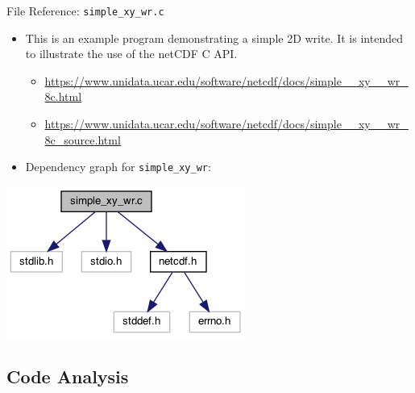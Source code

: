 \documentclass[compress,11pt,xcolor=svgnames,aspectratio=169]{beamer}
\begin{document}
\begin{frame}[fragile]{File Reference: \texttt{simple\_xy\_wr.c}}

\begin{itemize}
\setlength\itemsep{0.4cm}

  \item This is an example program demonstrating a simple 2D write. It is intended to illustrate the use of the netCDF C API.

    \begin{itemize}
    \setlength\itemsep{0.2cm}
      \item {\scriptsize \url{https://www.unidata.ucar.edu/software/netcdf/docs/simple__xy__wr_8c.html}}
      \item {\scriptsize \url{https://www.unidata.ucar.edu/software/netcdf/docs/simple__xy__wr_8c_source.html}}
    \end{itemize}

  \item Dependency graph for \verb|simple_xy_wr|:

\end{itemize}

\begin{center}
\includegraphics[scale=0.5]{fig/simple__xy__wr_8c__incl}
\end{center}

\end{frame}

\subsection{Code Analysis}
\end{document}
